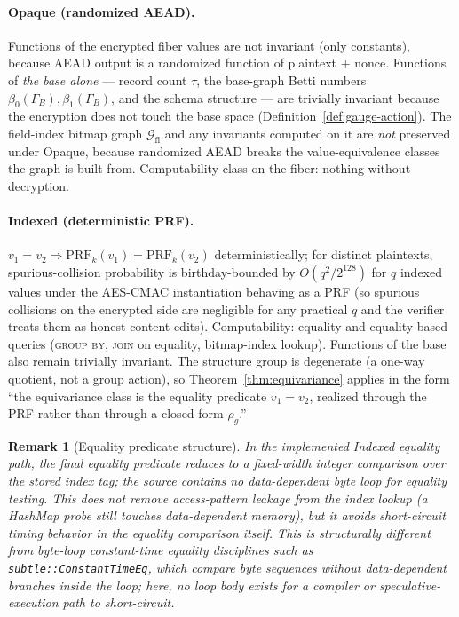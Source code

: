 \documentclass[11pt,letterpaper]{article}
\newtheorem{remark}[theorem]{Remark}
\begin{document}
\paragraph{Opaque (randomized AEAD).}
Functions of the encrypted fiber values are not invariant
(only constants), because AEAD output is a randomized function
of plaintext + nonce. Functions of \emph{the base alone} ---
record count $\tau$, the base-graph Betti numbers
$\beta_0(\Gamma_{\!B}), \beta_1(\Gamma_{\!B})$, and the schema
structure --- are trivially invariant because the encryption
does not touch the base space (Definition~\ref{def:gauge-action}).
The field-index bitmap graph $\mathcal{G}_{\mathrm{fi}}$ and any
invariants computed on it are \emph{not} preserved under Opaque,
because randomized AEAD breaks the value-equivalence classes the
graph is built from. Computability class on the fiber: nothing
without decryption.

\paragraph{Indexed (deterministic PRF).}
$v_1 = v_2 \Rightarrow \mathrm{PRF}_k(v_1) = \mathrm{PRF}_k(v_2)$
deterministically; for distinct plaintexts, spurious-collision
probability is birthday-bounded by $O(q^2 / 2^{128})$ for $q$
indexed values under the AES-CMAC instantiation behaving as a
PRF (so spurious collisions on the encrypted side are negligible
for any practical $q$ and the verifier treats them as honest
content edits). Computability: equality
and equality-based queries (\textsc{group by}, \textsc{join} on
equality, bitmap-index lookup). Functions of the base also remain
trivially invariant. The structure group is degenerate (a
one-way quotient, not a group action), so
Theorem~\ref{thm:equivariance} applies in the form ``the
equivariance class is the equality predicate $v_1 = v_2$,
realized through the PRF rather than through a closed-form
$\rho_g$.''

\begin{remark}[Equality predicate structure]
\label{rmk:indexed-eq}
In the implemented Indexed equality path, the final equality
predicate reduces to a fixed-width integer comparison over the
stored index tag; the source contains no data-dependent byte
loop for equality testing. This does not remove access-pattern
leakage from the index lookup (a HashMap probe still touches
data-dependent memory), but it avoids short-circuit timing
behavior in the equality comparison itself. This is structurally
different from byte-loop constant-time equality disciplines such
as \texttt{subtle::ConstantTimeEq}, which compare byte sequences
without data-dependent branches \emph{inside} the loop; here, no
loop body exists for a compiler or speculative-execution path to
short-circuit.
\end{remark}
\end{document}
